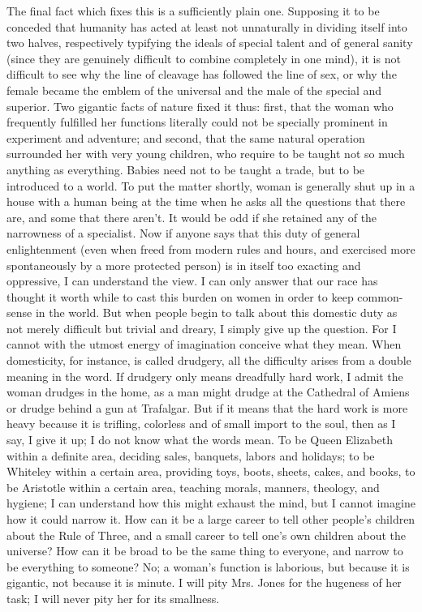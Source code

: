 \documentclass{book}
\begin{document}
The final fact which fixes this is a sufficiently plain one. Supposing it to be conceded that humanity has acted at least not unnaturally in dividing itself into two halves, respectively typifying the ideals of special talent and of general sanity (since they are genuinely difficult to combine completely in one mind), it is not difficult to see why the line of cleavage has followed the line of sex, or why the female became the emblem of the universal and the male of the special and superior. Two gigantic facts of nature fixed it thus: first, that the woman who frequently fulfilled her functions literally could not be specially prominent in experiment and adventure; and second, that the same natural operation surrounded her with very young children, who require to be taught not so much anything as everything. Babies need not to be taught a trade, but to be introduced to a world. To put the matter shortly, woman is generally shut up in a house with a human being at the time when he asks all the questions that there are, and some that there aren’t. It would be odd if she retained any of the narrowness of a specialist. Now if anyone says that this duty of general enlightenment (even when freed from modern rules and hours, and exercised more spontaneously by a more protected person) is in itself too exacting and oppressive, I can understand the view. I can only answer that our race has thought it worth while to cast this burden on women in order to keep common-sense in the world. But when people begin to talk about this domestic duty as not merely difficult but trivial and dreary, I simply give up the question. For I cannot with the utmost energy of imagination conceive what they mean. When domesticity, for instance, is called drudgery, all the difficulty arises from a double meaning in the word. If drudgery only means dreadfully hard work, I admit the woman drudges in the home, as a man might drudge at the Cathedral of Amiens or drudge behind a gun at Trafalgar. But if it means that the hard work is more heavy because it is trifling, colorless and of small import to the soul, then as I say, I give it up; I do not know what the words mean. To be Queen Elizabeth within a definite area, deciding sales, banquets, labors and holidays; to be Whiteley within a certain area, providing toys, boots, sheets, cakes, and books, to be Aristotle within a certain area, teaching morals, manners, theology, and hygiene; I can understand how this might exhaust the mind, but I cannot imagine how it could narrow it. How can it be a large career to tell other people’s children about the Rule of Three, and a small career to tell one’s own children about the universe? How can it be broad to be the same thing to everyone, and narrow to be everything to someone? No; a woman’s function is laborious, but because it is gigantic, not because it is minute. I will pity Mrs. Jones for the hugeness of her task; I will never pity her for its smallness.
\end{document}
